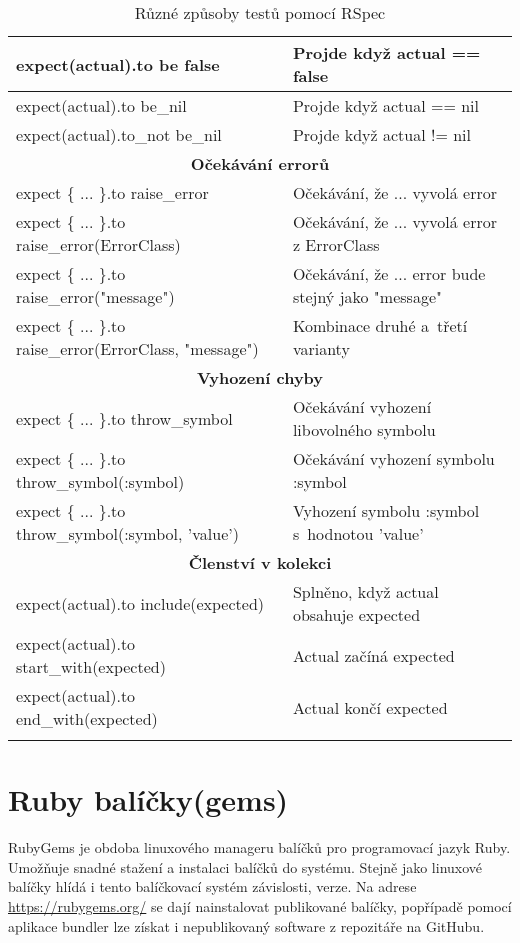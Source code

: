 \begin{center}
\begin{longtable}{| m{} | m{} |}
 \hline
 expect(actual).to be false   & Projde když actual == false \\
 \hline
 expect(actual).to be\_nil     & Projde když actual == nil \\
 \hline
 expect(actual).to\_not be\_nil & Projde když actual != nil \\
 \hline
 \multicolumn{2}{||c||}{\textbf{Očekávání errorů}}\\
 \hline
 expect \{ ... \}.to raise\_error & Očekávání, že ... vyvolá error \\
 \hline
 expect \{ ... \}.to raise\_error(ErrorClass) & Očekávání, že ... vyvolá error z ErrorClass\\
 \hline
 expect \{ ... \}.to raise\_error("message") & Očekávání, že ... error bude stejný jako "message" \\
 \hline
 expect \{ ... \}.to raise\_error(ErrorClass, "message")  & Kombinace druhé a~třetí varianty \\
 \hline
 \multicolumn{2}{||c||}{\textbf{Vyhození chyby}}\\
 \hline
 expect \{ ... \}.to throw\_symbol & Očekávání vyhození libovolného symbolu\\ 
 \hline
 expect \{ ... \}.to throw\_symbol(:symbol) & Očekávání vyhození symbolu :symbol\\ 
 \hline
 expect \{ ... \}.to throw\_symbol(:symbol, 'value') & Vyhození symbolu :symbol s~hodnotou 'value'\\ 
 \hline
 \multicolumn{2}{||c||}{\textbf{Členství v kolekci}}\\
 \hline
 expect(actual).to include(expected) & Splněno, když actual obsahuje expected \\
 \hline
 expect(actual).to start\_with(expected) & Actual začíná expected \\
 \hline
 expect(actual).to end\_with(expected) & Actual končí expected \\
 \hline
 \caption[RSpec metody testování]{Různé způsoby testů pomocí RSpec}\label{tab:rspec}
\end{longtable}
\end{center}

\section{Ruby balíčky(gems)}
\par RubyGems\cite{elmendorfdirk2006} je obdoba linuxového manageru balíčků pro programovací jazyk Ruby. Umožňuje snadné stažení a instalaci balíčků do systému. Stejně jako linuxové balíčky hlídá i tento balíčkovací systém závislosti, verze. Na adrese \url{https://rubygems.org/} se dají nainstalovat publikované balíčky, popřípadě pomocí aplikace bundler lze získat i nepublikovaný software z repozitáře na GitHubu. 